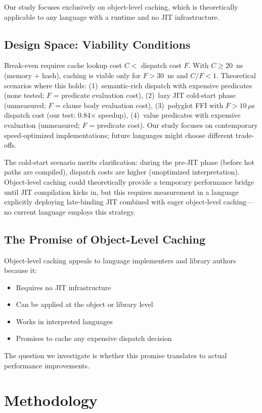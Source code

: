 \documentclass[sigplan,final,acmsmall,review,screen]{acmart}
\begin{document}
Our study focuses exclusively on object-level caching, which is theoretically applicable to any
language with a runtime and no JIT infrastructure.

\subsection{Design Space: Viability Conditions}

Break-even requires cache lookup cost $C < $ dispatch cost $F$. With $C \geq 20$~ns (memory + hash), caching is viable only for $F > 30$~ns and $C/F < 1$. Theoretical scenarios where this holds: (1)~semantic-rich dispatch with expensive predicates (none tested; $F$ = predicate evaluation cost), (2)~lazy JIT cold-start phase (unmeasured; $F$ = clause body evaluation cost), (3)~polyglot FFI with $F > 10\,\mu$s dispatch cost (our test: 0.84× speedup), (4)~value predicates with expensive evaluation (unmeasured; $F$ = predicate cost). Our study focuses on contemporary speed-optimized implementations; future languages might choose different trade-offs.

The cold-start scenario merits clarification: during the pre-JIT phase (before hot paths are compiled), dispatch costs are higher (unoptimized interpretation). Object-level caching could theoretically provide a temporary performance bridge until JIT compilation kicks in, but this requires measurement in a language explicitly deploying late-binding JIT combined with eager object-level caching—no current language employs this strategy.

\subsection{The Promise of Object-Level Caching}

Object-level caching appeals to language implementers and library authors because it:
\begin{itemize}
  \item Requires no JIT infrastructure
  \item Can be applied at the object or library level
  \item Works in interpreted languages
  \item Promises to cache any expensive dispatch decision
\end{itemize}

The question we investigate is whether this promise translates to actual performance improvements.

\section{Methodology}
\end{document}
